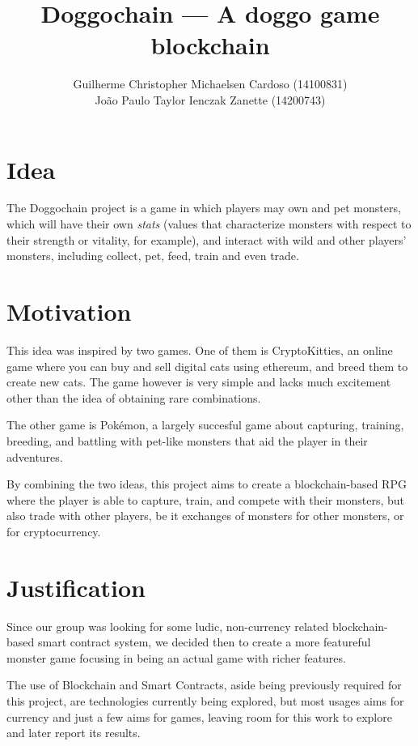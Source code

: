 \documentclass{article}
\title{Doggochain --- A doggo game blockchain}
\author{%
    Guilherme Christopher Michaelsen Cardoso (14100831) \\
    João Paulo Taylor Ienczak Zanette (14200743)
}
\begin{document}
    \maketitle

    \section{Idea}

    The Doggochain project is a game in which players may own and pet monsters,
    which will have their own \textit{stats} (values that characterize monsters
    with respect to their strength or vitality, for example), and interact with
    wild and other players' monsters, including collect, pet, feed, train and
    even trade.

    \section{Motivation}

    This idea was inspired by two games. One of them is CryptoKitties, an
    online game where you can buy and sell digital cats using ethereum, and
    breed them to create new cats. The game however is very simple and lacks
    much excitement other than the idea of obtaining rare combinations.

    The other game is Pokémon, a largely succesful game about capturing,
    training, breeding, and battling with pet-like monsters that aid the player
    in their adventures.

    By combining the two ideas, this project aims to create a blockchain-based
    RPG where the player is able to capture, train, and compete with their
    monsters, but also trade with other players, be it exchanges of monsters
    for other monsters, or for cryptocurrency.

    \section{Justification}

    Since our group was looking for some ludic, non-currency related
    blockchain-based smart contract system, we decided then to create a more
    featureful monster game focusing in being an actual game with richer
    features.

    The use of Blockchain and Smart Contracts, aside being previously required
    for this project, are technologies currently being explored, but most
    usages aims for currency and just a few aims for games, leaving room for
    this work to explore and later report its results.
\end{document}
